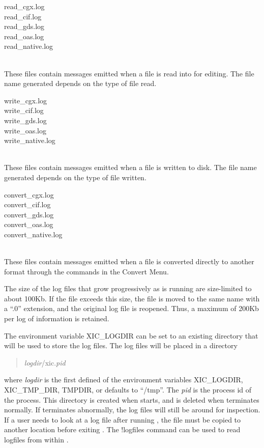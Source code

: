 \begin{itemize}
\begin{description}
\item\parbox[b]{4in}{\vt
read\_cgx.log\\
read\_cif.log\\
read\_gds.log\\
read\_oas.log\\
read\_native.log}\\
These files contain messages emitted when a file is read into {\Xic}
for editing.  The file name generated depends on the type of file read.

\item\parbox[b]{4in}{\vt
write\_cgx.log\\
write\_cif.log\\
write\_gds.log\\
write\_oas.log\\
write\_native.log}\\
These files contain messages emitted when a file is written to disk.
The file name generated depends on the type of file written.

\item\parbox[b]{4in}{\vt
convert\_cgx.log\\
convert\_cif.log\\
convert\_gds.log\\
convert\_oas.log\\
convert\_native.log}\\
These files contain messages emitted when a file is converted directly
to another format through the commands in the {\cb Convert Menu}.
\end{description}

The size of the log files that grow progressively as {\Xic} is running
are size-limited to about 100Kb.  If the file exceeds this size, the
file is moved to the same name with a ``{\vt .0}'' extension, and the
original log file is reopened.  Thus, a maximum of 200Kb per log of
information is retained.

The environment variable {\et XIC\_LOGDIR} can be set to an existing
directory that will be used to store the log files.  The log files
will be placed in a directory
\begin{quote}
{\it logdir}/{\vt xic}.{\it pid}
\end{quote}
where {\it logdir} is the first defined of the environment variables
{\et XIC\_LOGDIR}, {\et XIC\_TMP\_DIR}, {\et TMPDIR}, or defaults to
``{\et /tmp}''.  The {\it pid} is the process id of the {\Xic}
process.  This directory is created when {\Xic} starts, and is deleted
when {\Xic} terminates normally.  If {\Xic} terminates abnormally, the
log files will still be around for inspection.  If a user needs to
look at a log file after running {\Xic}, the file must be copied to
another location before exiting {\Xic}.  The {\cb !logfiles} command
can be used to read logfiles from within {\Xic}.


\end{itemize}
